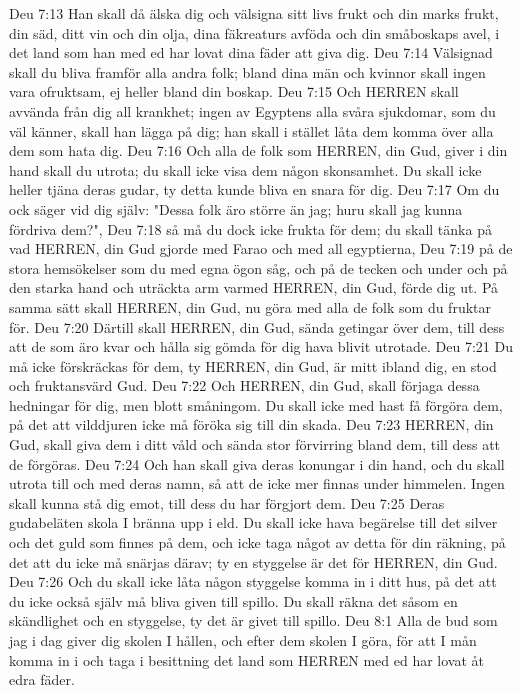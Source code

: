 Deu 7:13  Han skall då älska dig och välsigna sitt livs frukt och din marks frukt, din säd, ditt vin och din olja, dina fäkreaturs avföda och din småboskaps avel, i det land som han med ed har lovat dina fäder att giva dig.
Deu 7:14  Välsignad skall du bliva framför alla andra folk; bland dina män och kvinnor skall ingen vara ofruktsam, ej heller bland din boskap.
Deu 7:15  Och HERREN skall avvända från dig all krankhet; ingen av Egyptens alla svåra sjukdomar, som du väl känner, skall han lägga på dig; han skall i stället låta dem komma över alla dem som hata dig.
Deu 7:16  Och alla de folk som HERREN, din Gud, giver i din hand skall du utrota; du skall icke visa dem någon skonsamhet. Du skall icke heller tjäna deras gudar, ty detta kunde bliva en snara för dig.
Deu 7:17  Om du ock säger vid dig själv: "Dessa folk äro större än jag; huru skall jag kunna fördriva dem?",
Deu 7:18  så må du dock icke frukta för dem; du skall tänka på vad HERREN, din Gud gjorde med Farao och med all egyptierna,
Deu 7:19  på de stora hemsökelser som du med egna ögon såg, och på de tecken och under och på den starka hand och uträckta arm varmed HERREN, din Gud, förde dig ut. På samma sätt skall HERREN, din Gud, nu göra med alla de folk som du fruktar för.
Deu 7:20  Därtill skall HERREN, din Gud, sända getingar över dem, till dess att de som äro kvar och hålla sig gömda för dig hava blivit utrotade.
Deu 7:21  Du må icke förskräckas för dem, ty HERREN, din Gud, är mitt ibland dig, en stod och fruktansvärd Gud.
Deu 7:22  Och HERREN, din Gud, skall förjaga dessa hedningar för dig, men blott småningom. Du skall icke med hast få förgöra dem, på det att vilddjuren icke må föröka sig till din skada.
Deu 7:23  HERREN, din Gud, skall giva dem i ditt våld och sända stor förvirring bland dem, till dess att de förgöras.
Deu 7:24  Och han skall giva deras konungar i din hand, och du skall utrota till och med deras namn, så att de icke mer finnas under himmelen. Ingen skall kunna stå dig emot, till dess du har förgjort dem.
Deu 7:25  Deras gudabeläten skola I bränna upp i eld. Du skall icke hava begärelse till det silver och det guld som finnes på dem, och icke taga något av detta för din räkning, på det att du icke må snärjas därav; ty en styggelse är det för HERREN, din Gud.
Deu 7:26  Och du skall icke låta någon styggelse komma in i ditt hus, på det att du icke också själv må bliva given till spillo. Du skall räkna det såsom en skändlighet och en styggelse, ty det är givet till spillo.
Deu 8:1  Alla de bud som jag i dag giver dig skolen I hållen, och efter dem skolen I göra, för att I mån komma in i och taga i besittning det land som HERREN med ed har lovat åt edra fäder.
